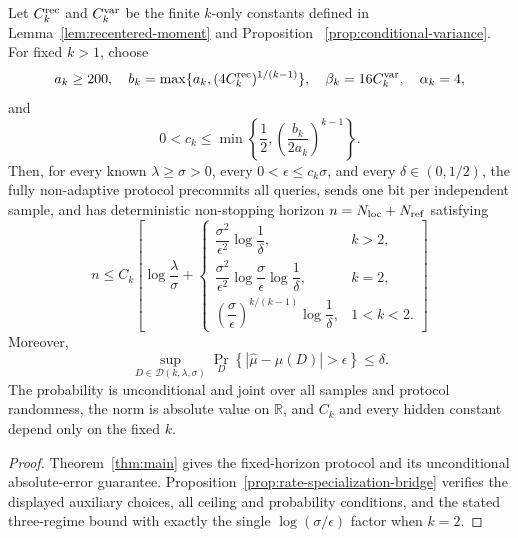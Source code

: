 \begin{corollary}
\label{cor:explicit-rate-specialization}
Let $C_k^{\rm rec}$ and $C_k^{\rm var}$ be the finite $k$-only constants
defined in Lemma~\ref{lem:recentered-moment} and Proposition~
\ref{prop:conditional-variance}.  For fixed $k>1$, choose
\[
 a_k\geq200,
 \quad b_k=\max\{a_k,(4C_k^{\rm rec})^{1/(k-1)}\},
 \quad \beta_k=16C_k^{\rm var},
 \quad \alpha_k=4,
\]
and
\[
 0<c_k\leq\min\left\{\frac12,
 \left(\frac{b_k}{2a_k}\right)^{k-1}\right\}.
\]
Then, for every known $\lambda\geq\sigma>0$, every
$0<\epsilon\leq c_k\sigma$, and every $\delta\in(0,1/2)$, the fully
non-adaptive protocol precommits all queries, sends one bit per independent
sample, and has deterministic non-stopping horizon
$n=N_{\rm loc}+N_{\rm ref}$ satisfying
\[
 n\leq C_k\left[\log\frac{\lambda}{\sigma}+
 \begin{cases}
 \dfrac{\sigma^2}{\epsilon^2}\log\dfrac1\delta,&k>2,\\[0.6em]
 \dfrac{\sigma^2}{\epsilon^2}\log\dfrac{\sigma}{\epsilon}
 \log\dfrac1\delta,&k=2,\\[0.6em]
 \left(\dfrac{\sigma}{\epsilon}\right)^{k/(k-1)}
 \log\dfrac1\delta,&1<k<2.
 \end{cases}\right]
\]
Moreover,
\[
 \sup_{D\in\mathcal D(k,\lambda,\sigma)}
 \Pr_D\left\{|\widehat\mu-\mu(D)|>\epsilon\right\}\leq\delta.
\]
The probability is unconditional and joint over all samples and protocol
randomness, the norm is absolute value on $\mathbb R$, and $C_k$ and every
hidden constant depend only on the fixed $k$.
\end{corollary}

\begin{proof}
Theorem~\ref{thm:main} gives the fixed-horizon protocol and its unconditional
absolute-error guarantee.  Proposition~\ref{prop:rate-specialization-bridge}
verifies the displayed auxiliary choices, all ceiling and probability
conditions, and the stated three-regime bound with exactly the single
$\log(\sigma/\epsilon)$ factor when $k=2$.
\end{proof}
